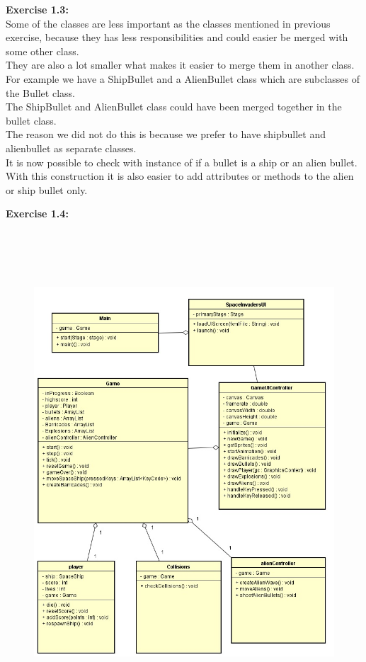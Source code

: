 \documentclass[10pt]{article}
\begin{document}
 \textbf{Exercise 1.3:} \\
Some of the classes are less important as the classes mentioned in previous exercise, because they has less responsibilities and could easier be merged with some other class.\\
They are also a lot smaller what makes it easier to merge them in another class. For example we have a ShipBullet and a AlienBullet class which are subclasses of the Bullet class. \\
 The ShipBullet and AlienBullet class could have been merged together in the bullet class. \\
The reason we did not do this is because we prefer to have shipbullet and alienbullet as separate classes. \\
It is now possible to check with instance of if a bullet is a ship or an alien bullet. \\
With this construction it is also easier to add attributes or methods to the alien or ship bullet only.\\
 \pagebreak

 \textbf{Exercise 1.4:} \\
\begin{figure}[ht!]
\centering
\includegraphics[width=14cm, height=18cm]{UMLSEM.jpg}
\end{figure}
\end{document}
